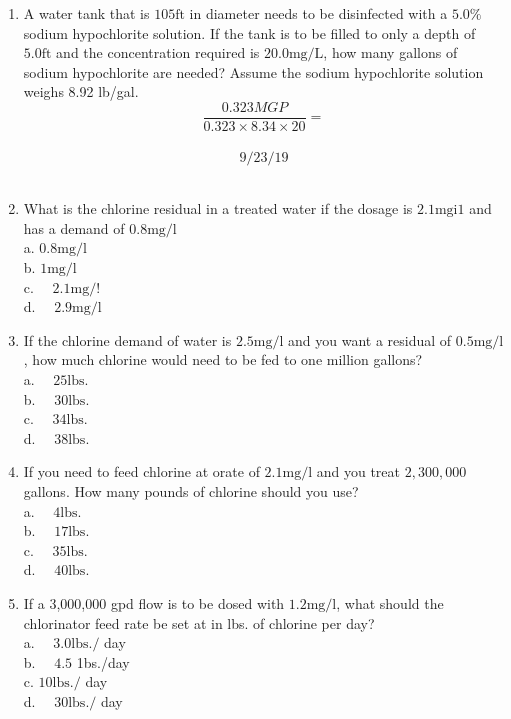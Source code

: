 \documentclass{article}
\begin{document}
\begin{enumerate}
\item A water tank that is $105 \mathrm{ft}$ in diameter needs to be disinfected with a $5.0 \%$ sodium hypochlorite solution. If the tank is to be filled to only a depth of $5.0 \mathrm{ft}$ and the concentration required is $20.0 \mathrm{mg} / \mathrm{L}$, how many gallons of sodium hypochlorite are needed? Assume the sodium hypochlorite solution weighs 8.92 lb/gal.\\
$$\frac{0.323 M G P}{0.323 \times 8.34 \times 20}=$$\\
$$9 / 23 / 19$$\\

\item What is the chlorine residual in a treated water if the dosage is $2.1 \mathrm{mgi1}$ and has a demand of $0.8 \mathrm{mg} / \mathrm{l}$\\
a. $0.8 \mathrm{mg} / \mathrm{l}$\\
b. $1 \mathrm{mg} / \mathrm{l}$\\
c. $\quad 2.1 \mathrm{mg} / !$\\
d. $\quad 2.9 \mathrm{mg} / \mathrm{l}$\\

\item If the chlorine demand of water is $2.5 \mathrm{mg} / \mathrm{l}$ and you want a residual of $0.5 \mathrm{mg} / \mathrm{l}$, how much chlorine would need to be fed to one million gallons?\\
a. $\quad 25 \mathrm{lbs}$.\\
b. $\quad 30 \mathrm{lbs}$.\\
c. $\quad 34 \mathrm{lbs}$.\\
d. $\quad 38 \mathrm{lbs}$.\\

\item If you need to feed chlorine at orate of $2.1 \mathrm{mg} / \mathrm{l}$ and you treat $2,300,000$ gallons. How many pounds of chlorine should you use?\\
a. $\quad 4 \mathrm{lbs}$.\\
b. $\quad 17 \mathrm{lbs}$.\\
c. $\quad 35 \mathrm{lbs}$.\\
d. $\quad 40 \mathrm{lbs}$.\\

\item If a 3,000,000 gpd flow is to be dosed with $1.2 \mathrm{mg} / \mathrm{l}$, what should the chlorinator feed rate be set at in lbs. of chlorine per day?\\
a. $\quad 3.0 \mathrm{lbs} . /$ day\\
b. $\quad 4.5$ 1bs./day\\
c. $10 \mathrm{lbs} . /$ day\\
d. $\quad 30 \mathrm{lbs} . /$ day\\



\end{enumerate}
\end{document}
